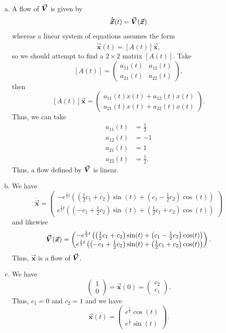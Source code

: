 \documentclass[12pt]{article} %
\newcommand{\vecx}{\boldsymbol{\vec{x}}}
\newcommand{\vecxdot}{\boldsymbol{\dot{\vec{x}}}}
\begin{document}
\begin{solution}~
\begin{enumerate}[(a)]
    \item A flow of $\boldsymbol{\vec{V}}$ is given by
    \[
    \vecxdot(t) = \vecfieldV(\vecx)
    \]
    whereas a linear system of equations assumes the form
    \[
    \vecxdot(t) = [A(t)] \vecx,
    \]
    so we should attempt to find a $2\times 2$ matrix $[A(t)]$. Take
    \[
    [A(t)] = \begin{pmatrix} a_{11}(t) & a_{12}(t) \\ a_{21}(t) & a_{22}(t) \end{pmatrix},
    \]
    then
    \[
[A(t)] \vecx = \begin{pmatrix} a_{11}(t) x(t) + a_{12}(t) x(t) \\ a_{21}(t) x(t) + a_{22}(t) x(t) \end{pmatrix}.   
    \]
Thus, we can take 
\begin{align*}
a_{11}(t) &= \frac{1}{2} \\
a_{12}(t) &= -1 \\
a_{21}(t) &= 1\\
a_{22}(t) &= \frac{1}{2}.
\end{align*}
Thus, a flow defined by $\boldsymbol{\vec{V}}$ is linear.

\item We have
\[
\vecxdot = \begin{pmatrix} -e^{\frac{1}{2} t}\left( \left(\frac{1}{2} c_1 + c_2\right) \sin(t) + \left(c_1-\frac{1}{2}c_2\right) \cos(t)\right) \\ e^{\frac{1}{2} t}\left( \left(-c_1 +\frac{1}{2} c_2\right) \sin(t) + \left(\frac{1}{2}c_1+c_2\right) \cos(t)\right) \end{pmatrix}
\]
and likewise
\[
\vecfieldV(\vecx) = \begin{pmatrix} -e^{\frac{1}{2} t}\left( \left(\frac{1}{2} c_1 + c_2\right) \sin(t) + \left(c_1-\frac{1}{2}c_2\right) \cos(t)\right) \\ e^{\frac{1}{2} t}\left( \left(-c_1 +\frac{1}{2} c_2\right) \sin(t) + \left(\frac{1}{2}c_1+c_2\right) \cos(t)\right) \end{pmatrix}.
\]
Thus, $\vecx$ is a flow of $\boldsymbol{\vec{V}}$.

\item We have
\[
\begin{pmatrix} 1 \\ 0 \end{pmatrix} = \vecx(0) = \begin{pmatrix} c_2 \\ c_1 \end{pmatrix}.
\]
Thus, $c_1=0$ and $c_2=1$ and we have
\[
\vecx(t) = \begin{pmatrix} e^{\frac{1}{t}} \cos(t) \\ e^{\frac{1}{t}} \sin(t) \end{pmatrix}.
\]


\end{enumerate}
\end{solution}
\end{document}
